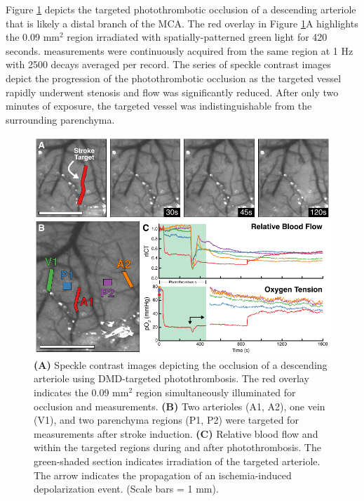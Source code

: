 Figure \ref{fig:photothrombosisacute} depicts the targeted photothrombotic occlusion of a descending arteriole that is likely a distal branch of the MCA. The red overlay in Figure \ref{fig:photothrombosisacute}A highlights the 0.09 mm$^2$ region irradiated with spatially-patterned green light for 420 seconds.  measurements were continuously acquired from the same region at 1 Hz with 2500 decays averaged per record. The series of speckle contrast images depict the progression of the photothrombotic occlusion as the targeted vessel rapidly underwent stenosis and flow was significantly reduced. After only two minutes of exposure, the targeted vessel was indistinguishable from the surrounding parenchyma.

\begin{figure}
    \includegraphics{figures/chapter_3/photothrombosisacute.pdf}
    \caption{
        \label{fig:photothrombosisacute}
        \textbf{(A)} Speckle contrast images depicting the occlusion of a descending arteriole using DMD-targeted photothrombosis. The red overlay indicates the 0.09 mm$^2$ region simultaneously illuminated for occlusion and  measurements. \textbf{(B)} Two arterioles (A1, A2), one vein (V1), and two parenchyma regions (P1, P2) were targeted for  measurements after stroke induction. \textbf{(C)} Relative blood flow and  within the targeted regions during and after photothrombosis. The green-shaded section indicates irradiation of the targeted arteriole. The arrow indicates the propagation of an ischemia-induced depolarization event. (Scale bars = 1 mm).
    }
\end{figure}

